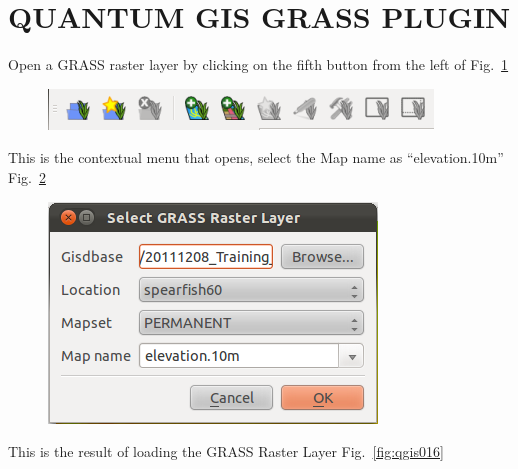 \section{QUANTUM GIS GRASS PLUGIN}

Open a GRASS raster layer by clicking on the fifth button from the
left of Fig.~\ref{fig:qgis014}

\begin{figure}[htbp]
   \centering
   \includegraphics[scale=0.45]{qgis014.png}
   \caption{}
   \label{fig:qgis014}
\end{figure}

This is the contextual menu that opens, select the Map name as
``elevation.10m'' Fig.~\ref{fig:qgis015}

\begin{figure}[htbp]
   \centering
   \includegraphics[scale=0.35]{qgis015.png}
   \caption{}
   \label{fig:qgis015}
\end{figure}


This is the result of loading the GRASS Raster Layer Fig.~\ref{fig:qgis016}

